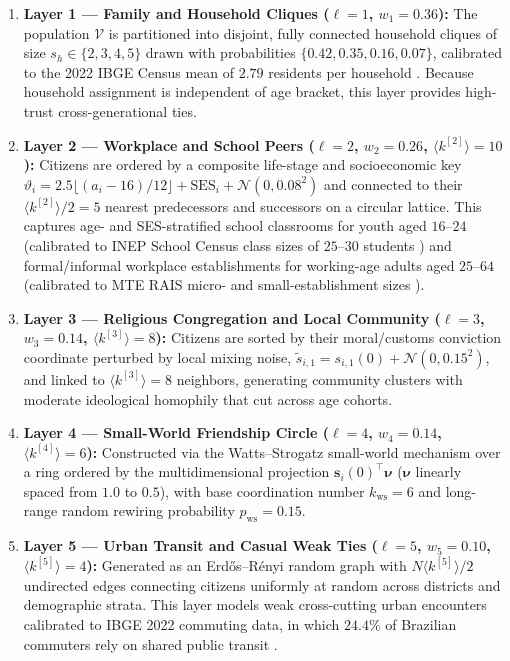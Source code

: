 \begin{enumerate}
    \item \textbf{Layer 1 — Family and Household Cliques ($\ell = 1$, $w_1 = 0.36$):}
    The population $\mathcal{V}$ is partitioned into disjoint, fully connected household cliques of size $s_h \in \{2, 3, 4, 5\}$ drawn with probabilities $\{0.42, 0.35, 0.16, 0.07\}$, calibrated to the 2022 IBGE Census mean of $2.79$ residents per household \citep{ibge2022censo}. Because household assignment is independent of age bracket, this layer provides high-trust cross-generational ties.
    \item \textbf{Layer 2 — Workplace and School Peers ($\ell = 2$, $w_2 = 0.26$, $\langle k^{[2]} \rangle = 10$):}
    Citizens are ordered by a composite life-stage and socioeconomic key $\vartheta_i = 2.5 \lfloor(a_i - 16)/12\rfloor + \mathrm{SES}_i + \mathcal{N}(0, 0.08^2)$ and connected to their $\langle k^{[2]} \rangle / 2 = 5$ nearest predecessors and successors on a circular lattice. This captures age- and SES-stratified school classrooms for youth aged $16\text{--}24$ (calibrated to INEP School Census class sizes of $25\text{--}30$ students \citep{inep2023censo}) and formal/informal workplace establishments for working-age adults aged $25\text{--}64$ (calibrated to MTE RAIS micro- and small-establishment sizes \citep{mte2023rais}).
    \item \textbf{Layer 3 — Religious Congregation and Local Community ($\ell = 3$, $w_3 = 0.14$, $\langle k^{[3]} \rangle = 8$):}
    Citizens are sorted by their moral/customs conviction coordinate perturbed by local mixing noise, $\tilde{s}_{i,1} = s_{i,1}(0) + \mathcal{N}(0, 0.15^2)$, and linked to $\langle k^{[3]} \rangle = 8$ neighbors, generating community clusters with moderate ideological homophily \citep{mcpherson2001birds} that cut across age cohorts.
    \item \textbf{Layer 4 — Small-World Friendship Circle ($\ell = 4$, $w_4 = 0.14$, $\langle k^{[4]} \rangle = 6$):}
    Constructed via the Watts--Strogatz small-world mechanism \citep{watts1998collective} over a ring ordered by the multidimensional projection $\mathbf{s}_i(0)^\top \mathbf{\nu}$ ($\mathbf{\nu}$ linearly spaced from $1.0$ to $0.5$), with base coordination number $k_{\mathrm{ws}} = 6$ and long-range random rewiring probability $p_{\mathrm{ws}} = 0.15$.
    \item \textbf{Layer 5 — Urban Transit and Casual Weak Ties ($\ell = 5$, $w_5 = 0.10$, $\langle k^{[5]} \rangle = 4$):}
    Generated as an Erd\H{o}s--R\'enyi random graph with $N \langle k^{[5]} \rangle / 2$ undirected edges connecting citizens uniformly at random across districts and demographic strata. This layer models weak cross-cutting urban encounters \citep{granovetter1973strength} calibrated to IBGE 2022 commuting data, in which $24.4\%$ of Brazilian commuters rely on shared public transit \citep{ibge2022censo}.
\end{enumerate}

